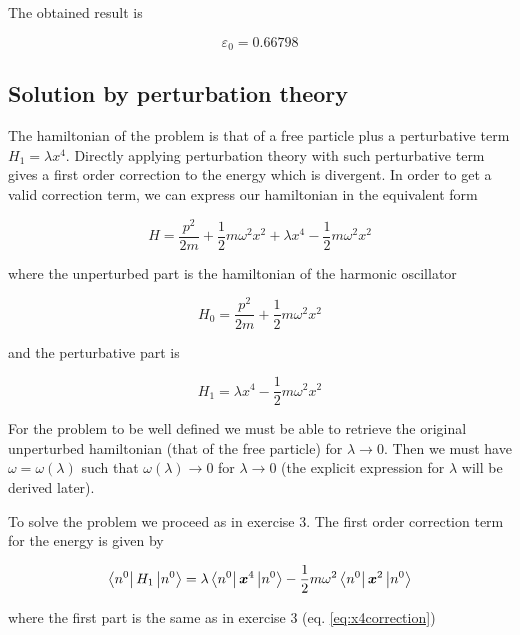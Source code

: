 \documentclass{article}
\begin{document}


The obtained result is

\begin{equation}
\varepsilon_0 = 0.66798
\end{equation}

\subsection{Solution by perturbation theory}
The hamiltonian of the problem is that of a free particle plus a perturbative term \( H_1 = \lambda x^4 \). Directly applying perturbation theory with such perturbative term gives a first order correction to the energy which is divergent. In order to get a valid correction term, we can express our hamiltonian in the equivalent form

\begin{equation}
H = \frac{p^2}{2m} + \frac{1}{2}m\omega^2x^2 + \lambda x^4 - \frac{1}{2}m\omega^2 x^2
\end{equation}

where the unperturbed part is the hamiltonian of the harmonic oscillator

\begin{equation}
H_0 = \frac{p^2}{2m} + \frac{1}{2}m\omega^2x^2
\end{equation}

and the perturbative part is

\begin{equation}
H_1 = \lambda x^4 - \frac{1}{2}m\omega^2 x^2
\end{equation}

For the problem to be well defined we must be able to retrieve the original unperturbed hamiltonian (that of the free particle) for \( \lambda \rightarrow 0 \). Then we must have \( \omega = \omega(\lambda) \) such that \( \omega(\lambda) \rightarrow 0 \) for \( \lambda \rightarrow 0 \) (the explicit expression for \( \lambda \) will be derived later).

To solve the problem we proceed as in exercise 3. The first order correction term for the energy is given by

\begin{equation}
\bra{n^0} H_1 \ket{n^0} = \lambda \bra{n^0}\bm{x}^4 \ket{n^0} - \frac{1}{2}m\omega^2 \bra{n^0}\bm{x}^2\ket{n^0}
\end{equation}

where the first part is the same as in exercise 3 (eq. \eqref{eq:x4correction})
\end{document}
